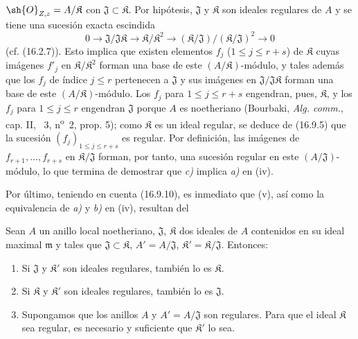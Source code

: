 $\sh{O}_{Z,z}=A/\mathfrak K$ con $\mathfrak J\subset\mathfrak K$. Por hipótesis, $\mathfrak J$ y $\mathfrak K$ son ideales regulares de $A$ y se tiene una sucesión exacta escindida
\[
  0\longrightarrow\mathfrak J/\mathfrak J\mathfrak K\longrightarrow\mathfrak K/\mathfrak K^2\longrightarrow(\mathfrak K/\mathfrak J)/(\mathfrak K/\mathfrak J)^2\longrightarrow0
\]
(cf. (16.2.7)). Esto implica que existen elementos $f_j$ ($1\leq j\leq r+s$) de $\mathfrak K$ cuyas imágenes $f'_j$ en $\mathfrak K/\mathfrak K^2$ forman una base de este $(A/\mathfrak K)$-módulo, y tales además que los $f_j$ de índice $j\leq r$ pertenecen a $\mathfrak J$ y sus imágenes en $\mathfrak J/\mathfrak J\mathfrak K$ forman una base de este $(A/\mathfrak K)$-módulo. Los $f_j$ para $1\leq j\leq r+s$ engendran, pues, $\mathfrak K$, y los $f_j$ para $1\leq j\leq r$ engendran $\mathfrak J$ porque $A$ es noetheriano (Bourbaki, \emph{Alg. comm.}, cap. II, \textsection~3, n\textsuperscript{o}~2, prop. 5); como $\mathfrak K$ es un ideal regular, se deduce de (16.9.5) que la sucesión $(f_j)_{1\leq j\leq r+s}$ es regular. Por definición, las imágenes de $f_{r+1},\ldots,f_{r+s}$ en $\mathfrak K/\mathfrak J$ forman, por tanto, una sucesión regular en este $(A/\mathfrak J)$-módulo, lo que termina de demostrar que \emph{c)} implica \emph{a)} en (iv).

Por último, teniendo en cuenta (16.9.10), es inmediato que (v), así como la equivalencia de \emph{a)} y \emph{b)} en (iv), resultan del

\begin{corollary}[19.1.6]
\label{IV.19.1.6}
Sean $A$ un anillo local noetheriano, $\mathfrak J$, $\mathfrak K$ dos ideales de $A$ contenidos en su ideal maximal $\mathfrak m$ y tales que $\mathfrak J\subset\mathfrak K$, $A'=A/\mathfrak J$, $\mathfrak K'=\mathfrak K/\mathfrak J$. Entonces:
\begin{enumerate}
  \item[\textup{(i)}] Si $\mathfrak J$ y $\mathfrak K'$ son ideales regulares, también lo es $\mathfrak K$.
  \item[\textup{(ii)}] Si $\mathfrak K$ y $\mathfrak K'$ son ideales regulares, también lo es $\mathfrak J$.
  \item[\textup{(iii)}] Supongamos que los anillos $A$ y $A'=A/\mathfrak J$ son regulares. Para que el ideal $\mathfrak K$ sea regular, es necesario y suficiente que $\mathfrak K'$ lo sea.
\end{enumerate}
\end{corollary}

